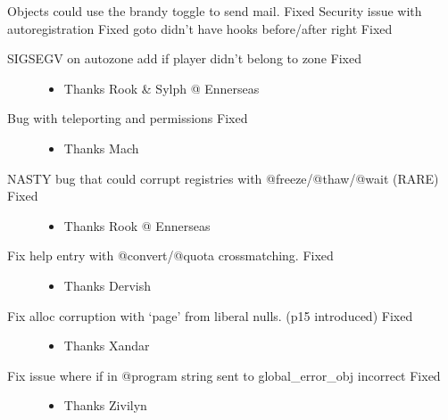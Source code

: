 \documentclass[letterpaper,10pt,english]{sphinxmanual}
\begin{document}
\sphinxAtStartPar
Objects could use the brandy toggle to send mail.  \sphinxhyphen{} Fixed
Security issue with autoregistration \sphinxhyphen{} Fixed
goto didn’t have hooks before/after right \sphinxhyphen{} Fixed
\begin{description}
\item[{SIGSEGV on autozone add if player didn’t belong to zone \sphinxhyphen{} Fixed}] \leavevmode\begin{itemize}
\item {} 
\sphinxAtStartPar
Thanks Rook \& Sylph @ Ennerseas

\end{itemize}

\item[{Bug with teleporting and permissions \sphinxhyphen{} Fixed}] \leavevmode\begin{itemize}
\item {} 
\sphinxAtStartPar
Thanks Mach 

\end{itemize}

\item[{NASTY bug that could corrupt registries with @freeze/@thaw/@wait (RARE) \sphinxhyphen{} Fixed}] \leavevmode\begin{itemize}
\item {} 
\sphinxAtStartPar
Thanks Rook @ Ennerseas

\end{itemize}

\item[{Fix help entry with @convert/@quota cross\sphinxhyphen{}matching. \sphinxhyphen{} Fixed}] \leavevmode\begin{itemize}
\item {} 
\sphinxAtStartPar
Thanks Dervish

\end{itemize}

\item[{Fix alloc corruption with ‘page’ from liberal nulls. (p15 introduced) \sphinxhyphen{} Fixed}] \leavevmode\begin{itemize}
\item {} 
\sphinxAtStartPar
Thanks Xandar

\end{itemize}

\item[{Fix issue where if in @program string sent to global\_error\_obj incorrect \sphinxhyphen{} Fixed}] \leavevmode\begin{itemize}
\item {} 
\sphinxAtStartPar
Thanks Zivilyn


\end{itemize}
\end{description}
\end{document}
